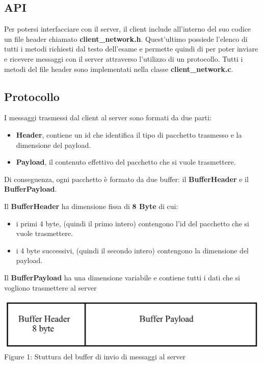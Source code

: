 \documentclass{article}
\begin{document}
\subsection{API}
Per potersi interfacciare con il server, il client include all'interno del suo codice un file header chiamato \textbf{client\_network.h}. Quest'ultimo possiede l'elenco di tutti i metodi
richiesti dal testo dell'esame e permette quindi di per poter inviare e ricevere messaggi con il server attraverso l'utilizzo di un protocollo. Tutti i metodi del file header sono 
implementati nella classe \textbf{client\_network.c}.

\subsection{Protocollo}
I messaggi trasmessi dal client al server sono formati da due parti:
\begin{itemize}
    \itemsep 0em 
    \item \textbf{Header}, contiene un id che identifica il tipo di pacchetto trasmesso e la dimensione del payload.
    \item \textbf{Payload}, il contenuto effettivo del pacchetto che si vuole trasmettere.
\end{itemize}

Di conseguenza, ogni pacchetto è formato da due buffer: il \textbf{BufferHeader} e il \textbf{BufferPayload}.
\medskip 

Il \textbf{BufferHeader} ha dimensione fissa di \textbf{8 Byte} di cui:
\begin{itemize}
    \itemsep 0em 
    \item i primi 4 byte, (quindi il primo intero) contengono l'id del pacchetto che si vuole trasmettere.
    \item i 4 byte successivi, (quindi il secondo intero) contengono la dimensione del payload.
\end{itemize}

Il \textbf{BufferPayload} ha una dimensione variabile e contiene tutti i dati che si vogliono trasmettere al server

\begin{center}
    \includegraphics[width=\textwidth]{buffer}   
    Figure 1: Stuttura del buffer di invio di messaggi al server
\end{center}
\end{document}
